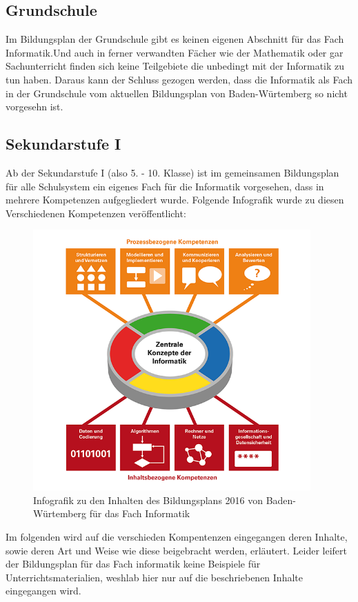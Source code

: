 \subsection{Grundschule}
Im Bildungsplan der Grundschule gibt es keinen eigenen Abschnitt für das Fach Informatik\cite{Fachuebersicht}.Und auch in ferner verwandten Fächer wie der Mathematik\cite{Mathematik} oder gar Sachunterricht\cite{Sachunterricht}  finden sich keine Teilgebiete die unbedingt mit der Informatik zu tun haben. Daraus kann der Schluss gezogen werden, dass die Informatik als Fach in der Grundschule vom aktuellen Bildungsplan von Baden-Würtemberg so nicht vorgesehn ist.

\subsection{Sekundarstufe I}
Ab der Sekundarstufe I (also 5. - 10. Klasse) ist im gemeinsamen Bildungsplan für alle Schulsystem ein eigenes Fach für die Informatik vorgesehen, dass in mehrere Kompetenzen aufgegliedert wurde\cite{Informatik}. Folgende Infografik wurde zu diesen Verschiedenen Kompetenzen veröffentlicht:

\begin{figure}[H]
	\centering
	\includegraphics[width=\textwidth,height=10cm,keepaspectratio]{images/BildungsplanInformatik.png}
	\caption{Infografik zu den Inhalten des Bildungsplans 2016 von Baden-Würtemberg für das Fach Informatik}
	\label{Bildungsplan Infromatik Infografik}
\end{figure}

Im folgenden wird auf die verschieden Kompentenzen eingegangen deren Inhalte, sowie deren Art und Weise wie diese beigebracht werden, erläutert. Leider leifert der Bildungsplan für das Fach informatik keine Beispiele für Unterrichtsmaterialien, weshlab hier nur auf die beschriebenen Inhalte eingegangen wird.

